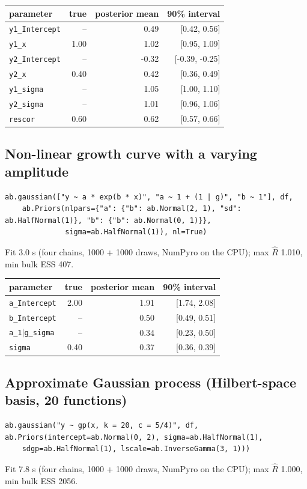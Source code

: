 \documentclass[11pt]{article}
\newcommand{\code}[1]{\texttt{#1}}
\begin{document}
\begin{center}\begin{tabular}{@{}lrrr@{}}\toprule parameter & true & posterior mean & 90\% interval \\ \midrule
\code{y1\_Intercept} & -- & 0.49 & [0.42, 0.56] \\
\code{y1\_x} & 1.00 & 1.02 & [0.95, 1.09] \\
\code{y2\_Intercept} & -- & -0.32 & [-0.39, -0.25] \\
\code{y2\_x} & 0.40 & 0.42 & [0.36, 0.49] \\
\code{y1\_sigma} & -- & 1.05 & [1.00, 1.10] \\
\code{y2\_sigma} & -- & 1.01 & [0.96, 1.06] \\
\code{rescor} & 0.60 & 0.62 & [0.57, 0.66] \\
\bottomrule\end{tabular}\end{center}\normalsize

\subsection*{Non-linear growth curve with a varying amplitude}
\begin{lstlisting}
ab.gaussian(["y ~ a * exp(b * x)", "a ~ 1 + (1 | g)", "b ~ 1"], df,
    ab.Priors(nlpars={"a": {"b": ab.Normal(2, 1), "sd": ab.HalfNormal(1)}, "b": {"b": ab.Normal(0, 1)}},
              sigma=ab.HalfNormal(1)), nl=True)
\end{lstlisting}
\noindent\small Fit 3.0 s (four chains, 1000 + 1000 draws, NumPyro on the CPU); max $\hat R$ 1.010, min bulk ESS 407.

\begin{center}\begin{tabular}{@{}lrrr@{}}\toprule parameter & true & posterior mean & 90\% interval \\ \midrule
\code{a\_Intercept} & 2.00 & 1.91 & [1.74, 2.08] \\
\code{b\_Intercept} & -- & 0.50 & [0.49, 0.51] \\
\code{a\_1$|$g\_sigma} & -- & 0.34 & [0.23, 0.50] \\
\code{sigma} & 0.40 & 0.37 & [0.36, 0.39] \\
\bottomrule\end{tabular}\end{center}\normalsize

\subsection*{Approximate Gaussian process (Hilbert-space basis, 20 functions)}
\begin{lstlisting}
ab.gaussian("y ~ gp(x, k = 20, c = 5/4)", df, ab.Priors(intercept=ab.Normal(0, 2), sigma=ab.HalfNormal(1),
    sdgp=ab.HalfNormal(1), lscale=ab.InverseGamma(3, 1)))
\end{lstlisting}
\noindent\small Fit 7.8 s (four chains, 1000 + 1000 draws, NumPyro on the CPU); max $\hat R$ 1.000, min bulk ESS 2056.
\end{document}
